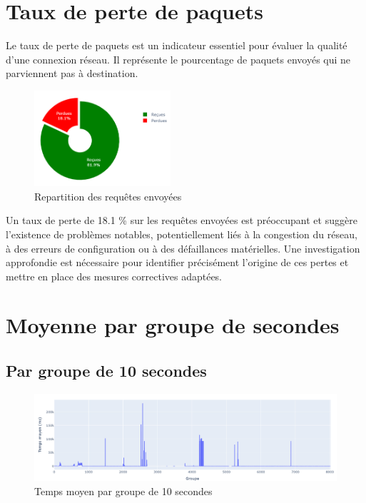 \section{Taux de perte de paquets}
Le taux de perte de paquets est un indicateur essentiel pour évaluer la qualité d’une connexion réseau. Il représente le pourcentage de paquets envoyés qui ne parviennent pas à destination.
\vspace{-0.5cm}
\begin{figure}[H]	
	\centering 
	\caption{ Repartition des requêtes envoyées}
	\includegraphics[width=0.45\textwidth, keepaspectratio]{Images/newplot.png}
\end{figure}
\vspace{-0.5cm}
 Un taux de perte de 18.1 \% sur les requêtes envoyées est préoccupant et suggère l’existence de problèmes notables, potentiellement liés à la congestion du réseau, à des erreurs de configuration ou à des défaillances matérielles. Une investigation approfondie est nécessaire pour identifier précisément l'origine de ces pertes et mettre en place des mesures correctives adaptées.
\section{Moyenne par groupe de secondes}
\subsection{Par groupe de 10 secondes}
\vspace{-0.5cm}
\begin{figure}[H]	
	\centering 
	\caption{ Temps moyen par groupe de 10 secondes}
	\includegraphics[width=1.05\textwidth, keepaspectratio]{Images/moy10.png}
\end{figure}
\vspace{-0.5cm}

